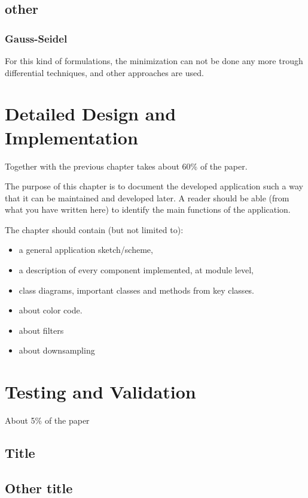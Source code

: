 \documentclass[12pt,a4paper,twoside]{report}
\begin{document}
\section{other}
\subsection{Gauss-Seidel} \label{GaussSeidel}

For this kind of formulations, the minimization can not be done any more trough differential techniques, and other approaches are used.

\chapter{Detailed Design and Implementation}

Together with the previous chapter takes about 60\% of the paper.

The purpose of this chapter is to document the developed application such a way that it can be maintained and developed later. A reader should be able (from what you have written here) to identify the main functions of the application.



The chapter should contain (but not limited to):
\begin{itemize}
 \item a general application sketch/scheme,
\item a description of every component implemented, at module level,
\item class diagrams, important classes and methods from key classes.
\item about color code.
\item about filters
\item about downsampling
\end{itemize}

\chapter{Testing and Validation}

About 5\% of the paper
\section{Title}
\section{Other title}
\end{document}
